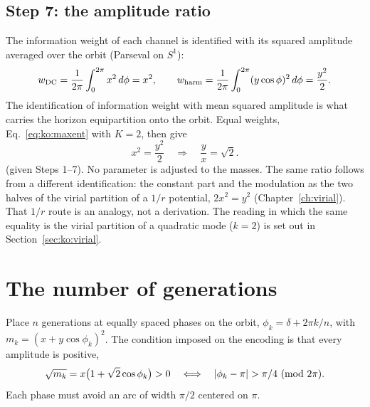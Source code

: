 \subsection{Step 7: the amplitude ratio}
The information weight of each channel is identified with its squared amplitude averaged over the orbit (Parseval on $S^1$):
\begin{equation}
w_{\rm DC}=\frac1{2\pi}\int_0^{2\pi}x^2\,d\phi=x^2,\qquad w_{\rm harm}=\frac1{2\pi}\int_0^{2\pi}(y\cos\phi)^2\,d\phi=\frac{y^2}{2}.\label{eq:ko:weights}
\end{equation}
The identification of information weight with mean squared amplitude is what carries the horizon equipartition onto the orbit.
\conjecture{} Equal weights, Eq.~\eqref{eq:ko:maxent} with $K=2$, then give
\begin{equation}
x^2=\frac{y^2}{2}\quad\Longrightarrow\quad\frac yx=\sqrt2.\label{eq:ko:ratio}
\end{equation}
\derived{} (given Steps 1--7). No parameter is adjusted to the masses. The same ratio follows from a different identification: the constant
part and the modulation as the two halves of the virial partition of a $1/r$ potential, $2x^2=y^2$ (Chapter~\ref{ch:virial}). That $1/r$ route is an
analogy, not a derivation. \analogy{} The reading in which the same equality is the virial partition of a quadratic mode ($k=2$) is set out in
Section~\ref{sec:ko:virial}.

\section{The number of generations}\label{sec:ko:count}
Place $n$ generations at equally spaced phases on the orbit, $\phi_k=\delta+2\pi k/n$, with $m_k=(x+y\cos\phi_k)^2$. The condition imposed on the
encoding is that every amplitude is positive,
\begin{equation}
\sqrt{m_k}=x\big(1+\sqrt2\cos\phi_k\big)>0\quad\Longleftrightarrow\quad|\phi_k-\pi|>\pi/4\ ({\rm mod}\ 2\pi).\label{eq:ko:pos}
\end{equation}
Each phase must avoid an arc of width $\pi/2$ centered on $\pi$. \derived

